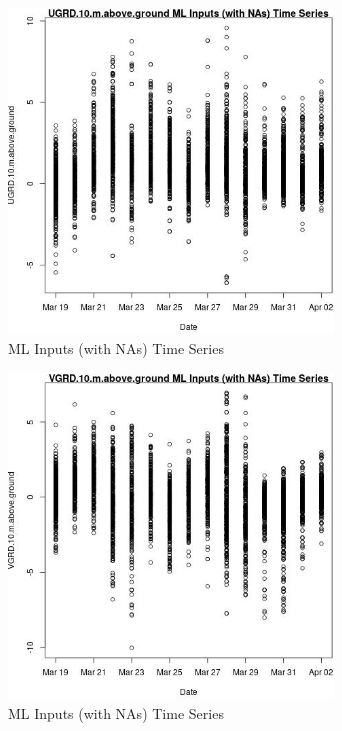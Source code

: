 \begin{figure} 
\centering  
\includegraphics[width=0.77\textwidth]{Code_Outputs/Report_ML_input_PM25_Step4_part_e_de_duplicated_aveswNAs_UGRD10mabovegroundvDate.jpg} 
\caption{\label{fig:Report_ML_input_PM25_Step4_part_e_de_duplicated_aveswNAsUGRD10mabovegroundvDate}ML Inputs (with NAs) Time Series} 
\end{figure} 
 

\begin{figure} 
\centering  
\includegraphics[width=0.77\textwidth]{Code_Outputs/Report_ML_input_PM25_Step4_part_e_de_duplicated_aveswNAs_VGRD10mabovegroundvDate.jpg} 
\caption{\label{fig:Report_ML_input_PM25_Step4_part_e_de_duplicated_aveswNAsVGRD10mabovegroundvDate}ML Inputs (with NAs) Time Series} 
\end{figure} 
 

